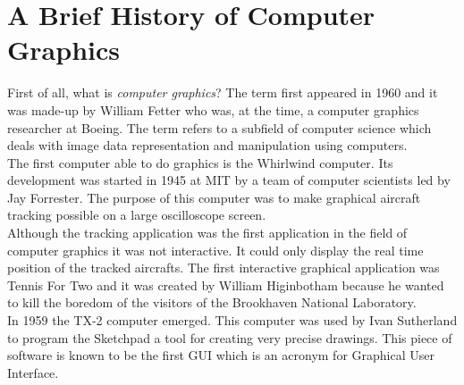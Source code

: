 \section{A Brief History of Computer Graphics}
First of all, what is \textit{computer graphics}? The term first appeared in 1960 and it was made-up by William Fetter who was, at the time, a computer graphics researcher at Boeing. The term refers to a subfield of computer science which deals with image data representation and manipulation using computers.\\
The first computer able to do graphics is the Whirlwind computer. Its development was started in 1945 at MIT by a team of computer scientists led by Jay Forrester. The purpose of this computer was to make graphical aircraft tracking possible on a large oscilloscope screen.\\
Although the tracking application was the first application in the field of computer graphics it was not interactive. It could only display the real time position of the tracked aircrafts. The first interactive graphical application was Tennis For Two and it was created by William Higinbotham because he wanted to kill the boredom of the visitors of the Brookhaven National Laboratory.\\
In 1959 the TX-2 computer emerged. This computer was used by Ivan Sutherland to program the Sketchpad a tool for creating very precise drawings. This piece of software is known to be the first GUI which is an acronym for Graphical User Interface.